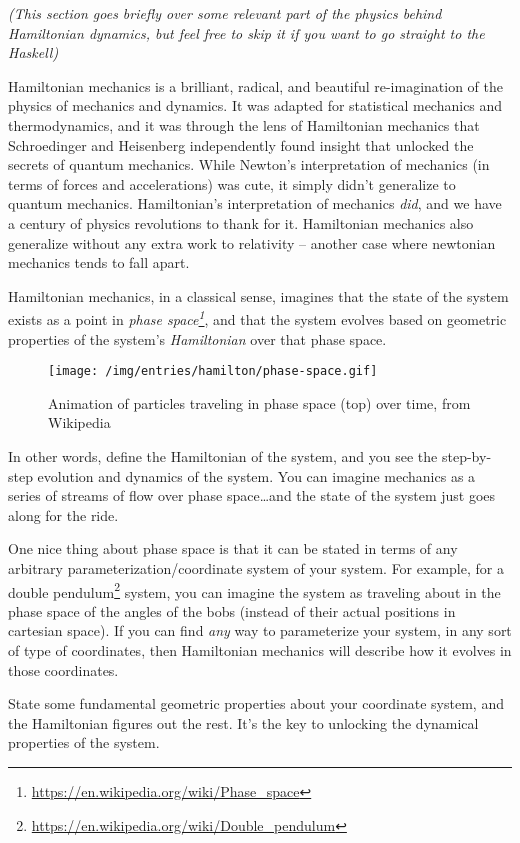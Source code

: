 \documentclass[]{article}
\renewcommand{\href}[2]{#2\footnote{\url{#1}}}
\begin{document}
\emph{(This section goes briefly over some relevant part of the physics behind
Hamiltonian dynamics, but feel free to skip it if you want to go straight to the
Haskell)}

Hamiltonian mechanics is a brilliant, radical, and beautiful re-imagination of
the physics of mechanics and dynamics. It was adapted for statistical mechanics
and thermodynamics, and it was through the lens of Hamiltonian mechanics that
Schroedinger and Heisenberg independently found insight that unlocked the
secrets of quantum mechanics. While Newton's interpretation of mechanics (in
terms of forces and accelerations) was cute, it simply didn't generalize to
quantum mechanics. Hamiltonian's interpretation of mechanics \emph{did}, and we
have a century of physics revolutions to thank for it. Hamiltonian mechanics
also generalize without any extra work to relativity -- another case where
newtonian mechanics tends to fall apart.

Hamiltonian mechanics, in a classical sense, imagines that the state of the
system exists as a point in
\emph{\href{https://en.wikipedia.org/wiki/Phase_space}{phase space}}, and that
the system evolves based on geometric properties of the system's
\emph{Hamiltonian} over that phase space.

\begin{figure}[htbp]
\centering
\texttt{[image: /img/entries/hamilton/phase-space.gif]}
\caption{Animation of particles traveling in phase space (top) over time, from
Wikipedia}
\end{figure}

In other words, define the Hamiltonian of the system, and you see the
step-by-step evolution and dynamics of the system. You can imagine mechanics as
a series of streams of flow over phase space\ldots{}and the state of the system
just goes along for the ride.

One nice thing about phase space is that it can be stated in terms of any
arbitrary parameterization/coordinate system of your system. For example, for a
\href{https://en.wikipedia.org/wiki/Double_pendulum}{double pendulum} system,
you can imagine the system as traveling about in the phase space of the angles
of the bobs (instead of their actual positions in cartesian space). If you can
find \emph{any} way to parameterize your system, in any sort of type of
coordinates, then Hamiltonian mechanics will describe how it evolves in those
coordinates.

State some fundamental geometric properties about your coordinate system, and
the Hamiltonian figures out the rest. It's the key to unlocking the dynamical
properties of the system.
\end{document}
